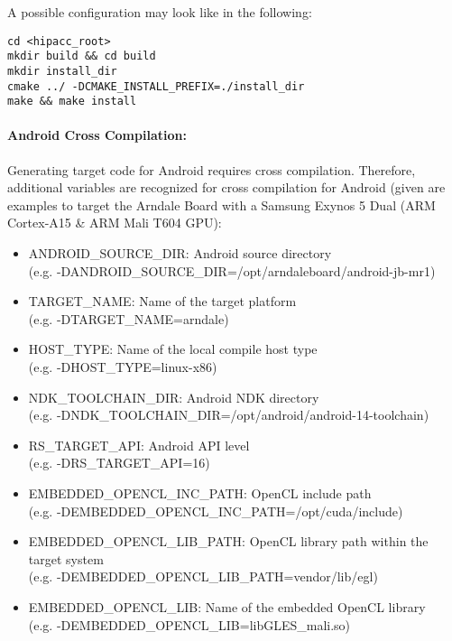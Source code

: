A possible configuration may look like in the following:
\begin{lstlisting}
cd <hipacc_root>
mkdir build && cd build
mkdir install_dir
cmake ../ -DCMAKE_INSTALL_PREFIX=./install_dir
make && make install
\end{lstlisting}


\paragraph{Android Cross Compilation:}
Generating target code for Android requires cross compilation. Therefore,
additional variables are recognized for cross compilation for Android (given
are examples to target the Arndale Board with a Samsung Exynos 5 Dual (ARM
Cortex-A15 \& ARM Mali T604 GPU):

\begin{itemize}
    \item ANDROID\_SOURCE\_DIR:         Android source directory\\(e.g. -DANDROID\_SOURCE\_DIR=/opt/arndaleboard/android-jb-mr1)
    \item TARGET\_NAME:                 Name of the target platform\\(e.g. -DTARGET\_NAME=arndale)
    \item HOST\_TYPE:                   Name of the local compile host type\\(e.g. -DHOST\_TYPE=linux-x86)
    \item NDK\_TOOLCHAIN\_DIR:          Android NDK directory\\(e.g. -DNDK\_TOOLCHAIN\_DIR=/opt/android/android-14-toolchain)
    \item RS\_TARGET\_API:              Android API level\\(e.g. -DRS\_TARGET\_API=16)
    \item EMBEDDED\_OPENCL\_INC\_PATH:  OpenCL include path\\(e.g. -DEMBEDDED\_OPENCL\_INC\_PATH=/opt/cuda/include)
    \item EMBEDDED\_OPENCL\_LIB\_PATH:  OpenCL library path within the target system\\(e.g. -DEMBEDDED\_OPENCL\_LIB\_PATH=vendor/lib/egl)
    \item EMBEDDED\_OPENCL\_LIB:        Name of the embedded OpenCL library\\(e.g. -DEMBEDDED\_OPENCL\_LIB=libGLES\_mali.so)
\end{itemize}

